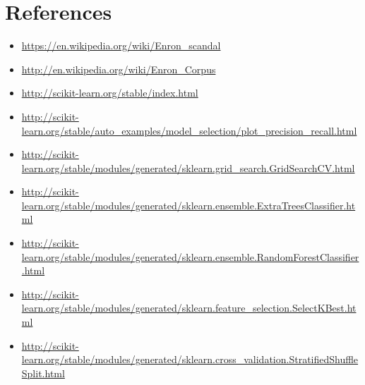 \documentclass[12pt]{article}%
\begin{document}
\section*{References}
\begin{itemize}
  \item \url{https://en.wikipedia.org/wiki/Enron_scandal	}
  
  \item \url{http://en.wikipedia.org/wiki/Enron_Corpus}

  \item \url{http://scikit-learn.org/stable/index.html} 
  
  \item \url{http://scikit-learn.org/stable/auto_examples/model_selection/plot_precision_recall.html}

  \item \url{http://scikit-learn.org/stable/modules/generated/sklearn.grid_search.GridSearchCV.html}
  
  \item \url{http://scikit-learn.org/stable/modules/generated/sklearn.ensemble.ExtraTreesClassifier.html}
  
  \item \url{http://scikit-learn.org/stable/modules/generated/sklearn.ensemble.RandomForestClassifier.html}
  
  \item \url{http://scikit-learn.org/stable/modules/generated/sklearn.feature_selection.SelectKBest.html}
  
  \item \url{http://scikit-learn.org/stable/modules/generated/sklearn.cross_validation.StratifiedShuffleSplit.html}
  
 \end{itemize}
\end{document}
